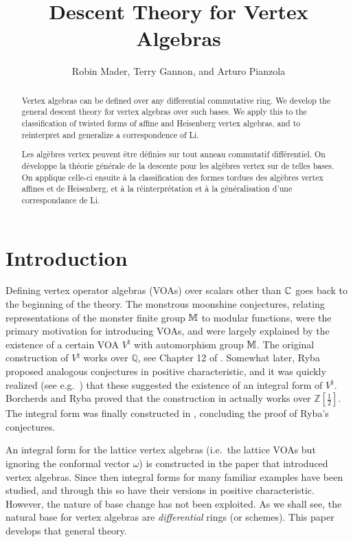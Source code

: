 \documentclass{article}
\author{Robin Mader, Terry Gannon, and Arturo Pianzola}
\date{}
\title{Descent Theory for Vertex Algebras}
\theoremstyle{definition}
\begin{document}
\maketitle

\begin{abstract}
\noindent Vertex algebras can be defined over any differential commutative ring. We develop the general descent theory for vertex algebras over such bases. We apply this to the classification of twisted forms of affine and Heisenberg vertex algebras, and to reinterpret and generalize a correspondence of Li.
\end{abstract}

\begin{otherlanguage}{french}
\begin{abstract}
\noindent Les alg\`ebres vertex peuvent \^etre d\'efinies sur tout anneau commutatif diff\'erentiel. On d\'eveloppe la th\'eorie g\'en\'erale de la descente pour les alg\`ebres vertex sur de telles bases. On applique celle-ci ensuite \`a la classification des formes tordues des alg\`ebres vertex affines et de Heisenberg, et \`a la r\'einterpr\'etation et \`a la g\'en\'eralisation d'une correspondance de Li.
\end{abstract}
\end{otherlanguage}

\section{Introduction} Defining vertex operator algebras (VOAs) over scalars other than $\Bbb{C}$ goes back to the beginning of the theory. The monstrous moonshine conjectures, relating representations of the monster finite group ${\Bbb M}$ to modular functions, were the primary motivation for introducing VOAs, and were largely explained by the existence of a certain VOA $V^\natural$ with automorphism group ${\Bbb M}$.
The original construction of $V^\natural$ works over $\mathbb Q$, see Chapter 12 of \cite{FLM}.
Somewhat later, Ryba \cite{Ry} proposed analogous conjectures in positive characteristic, and it was quickly realized (see e.g.\ \cite{BR}) that these suggested the existence of an integral form of $V^\natural$. Borcherds and Ryba \cite{BR} proved that the construction in \cite{FLM} actually works over $\mathbb Z[\frac{1}{2}]$. The integral form was finally constructed in \cite{Car}, concluding the proof of Ryba's conjectures.

An integral form for the lattice vertex algebras (i.e.\ the lattice VOAs but ignoring the conformal vector $\omega$) is constructed in the paper  \cite{Bor} that introduced vertex algebras. Since then integral forms for many familiar examples have been studied, and through this so have their versions in positive characteristic.  However, the nature of base change has not been exploited. As we shall see, the natural base for vertex algebras are {\it differential} rings (or schemes). This paper develops that general theory.
\end{document}
